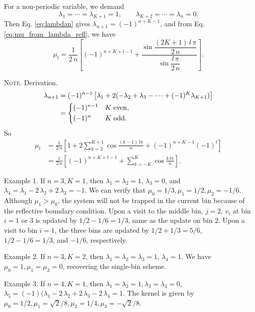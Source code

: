\documentclass[reprint, floatfix]{revtex4-1}
\newcommand{\note}[1]{{\color{DarkGreen}\footnotesize \textsc{Note.} #1}}
\begin{document}
For a non-periodic variable, we demand
$$
\lambda_1 = \cdots = \lambda_{K+1} = 1,
\qquad
\lambda_{K+2} = \cdots = \lambda_n = 0.
$$
Then Eq. \eqref{eq:lambdan} gives
$\lambda_{n+1} = (-1)^{n+K-1}$,
and from Eq. \eqref{eq:mu_from_lambda_refl},
we have
\begin{equation}
  \mu_l
  =
  \frac{1}{2 \, n}
  \left[
    (-1)^{n+K+l-1}
    +
    \frac{
      \sin
      \dfrac{ (2 K + 1) \, l \, \pi }
           {         2 \, n        }
    }
    {
      \sin \dfrac{ l \, \pi } { 2 \, n }
    }
  \right]
  .
\label{eq:mu_sinc_refl}
\end{equation}
\note{Derivation.
$$
\begin{aligned}
  \lambda_{n+1}
  &=
  (-1)^{n-1}
  \left[
    \lambda_1
    + 2 (-\lambda_2 + \lambda_3 - \cdots + (-1)^K \lambda_{K+1})
  \right]
  \\
  &=
  \begin{dcases}
    (-1)^{n-1} & K \mathrm{\; even,} \\
    (-1)^n     & K \mathrm{\; odd.}
  \end{dcases}
\end{aligned}
$$
So
$$
\begin{aligned}
  \mu_l
  &=
  \frac{1}{2\,n}
  \left[
    1 +
    2 \sum_{k=2}^{K+1}
    \cos \frac { (k - 1) \, l \pi } { n }
    +
    (-1)^{n+K-1} (-1)^l
  \right]
  \\
  &=
  \frac{1}{2\,n}
  \left[
    (-1)^{n+K+l-1}
    +
    \sum_{k=-K}^{K}
    \cos \frac { k \, l \pi } { n }
  \right]
  .
\end{aligned}
$$

\hrulefill

Example 1. If $n = 3, K = 1$,
then $\lambda_1 = \lambda_2 = 1$, $\lambda_3 = 0$,
and $\lambda_4 = \lambda_1 - 2 \, \lambda_2 + 2 \, \lambda_3 = -1$.
%
We can verify that $\mu_0 = 1/3, \mu_1 = 1/2, \mu_2 = -1/6$.
%
Although $\mu_1 > \mu_0$, the system will not be trapped
in the current bin because of the reflective boundary condition.
%
Upon a visit to the middle bin, $j = 2$,
$v_i$ at bin $i = 1$ or $3$ is updated by $1/2 - 1/6 = 1/3$,
same as the update on bin $2$.
Upon a visit to bin $i = 1$, the three bins are updated
by $1/2 + 1/3 = 5/6$, $1/2 - 1/6 = 1/3$, and $-1/6$,
respectively.

\hrulefill

Example 2. If $n = 3, K = 2$,
then $\lambda_1 = \lambda_2 = \lambda_3 = 1$, $\lambda_4 = 1$.
We have $\mu_0 = 1, \mu_1 = \mu_2 = 0$,
recovering the single-bin scheme.

\hrulefill

Example 3. If $n = 4, K = 1$,
then $\lambda_1 = \lambda_2 = 1, \lambda_3 = \lambda_4 = 0$,
$\lambda_5 = (-1)(\lambda_1 - 2 \, \lambda_2 + 2 \, \lambda_3 - 2 \, \lambda_4 = 1$.
The kernel is given by
$\mu_0 = 1/2, \mu_1 = \sqrt{2}/8, \mu_2 = 1/4, \mu_3 = -\sqrt{2}/8$.
}
\end{document}
